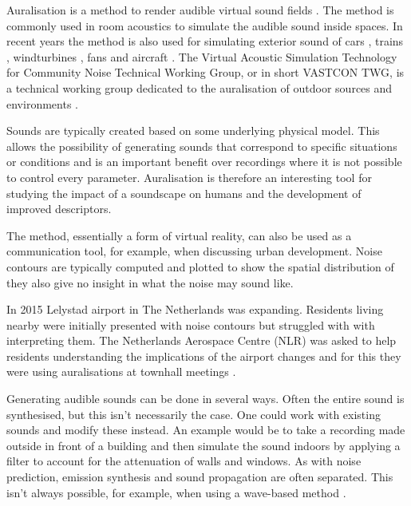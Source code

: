 Auralisation is a method to render audible virtual sound fields \cite{Kleiner1993}.
The method is commonly used in room acoustics to simulate the audible sound inside spaces.
In recent years the method is also used for simulating exterior sound of
cars \cite{Forssen2009,Maillard2012,Pieren2015,Hoffmann2016,Hoffmann2016a},
trains \cite{Pieren2016},
windturbines \cite{Pieren2014,Heutschi2014},
fans \cite{Merino2016} and
aircraft \cite{Arntzen2014a, Rizzi2016a, Rizzi2016}.
The Virtual Acoustic Simulation Technology for Community Noise Technical Working
Group, or in short VASTCON TWG, is a technical working group dedicated to the
auralisation of outdoor sources and environments \cite{Vastcon}.

Sounds are typically created based on some underlying physical model. This
allows the possibility of generating sounds that correspond to specific
situations or conditions and is an important benefit over recordings where it is
not possible to control every parameter. Auralisation is therefore an
interesting tool for studying the impact of a soundscape on humans and the
development of improved descriptors.

The method, essentially a form of virtual reality, can also be used as a
communication tool, for example, when discussing urban development. Noise
contours are typically computed and plotted to show the spatial distribution of
they also give no insight in what the noise may sound like.

In 2015 Lelystad airport in The Netherlands was expanding. Residents living
nearby were initially presented with noise contours but struggled with with
interpreting them. The Netherlands Aerospace Centre (NLR) was asked to help
residents understanding the implications of the airport changes and
for this they were using auralisations at townhall meetings \cite{Arntzen2015}.

Generating audible sounds can be done in several ways. Often the entire sound is
synthesised, but this isn't necessarily the case. One could work with existing
sounds and modify these instead. An example would be to take a recording made
outside in front of a building and then simulate the sound indoors by applying a
filter to account for the attenuation of walls and windows.
As with noise prediction, emission synthesis and sound propagation are often
separated. This isn't always possible, for example, when using a wave-based
method \cite{Hornikx2016,Georgiou2016,Georgiou2016a}.

